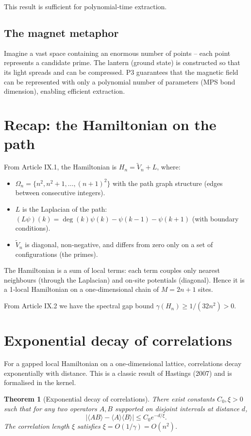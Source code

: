 \documentclass[11pt,a4paper]{article}
\newtheorem{theorem}{Theorem}[section]
\begin{document}
This result is sufficient for polynomial‑time extraction.

\subsection{The magnet metaphor}

Imagine a vast space containing an enormous number of points – each point represents a candidate prime. The lantern (ground state) is constructed so that its light spreads and can be compressed. P3 guarantees that the magnetic field can be represented with only a polynomial number of parameters (MPS bond dimension), enabling efficient extraction.

\section{Recap: the Hamiltonian on the path}

From Article IX.1, the Hamiltonian is $H_n = \tilde{V}_n + L$, where:
\begin{itemize}
\item $\Omega_n = \{n^2, n^2+1, \dots, (n+1)^2\}$ with the path graph structure (edges between consecutive integers).
\item $L$ is the Laplacian of the path: $(L\psi)(k) = \deg(k)\psi(k) - \psi(k-1) - \psi(k+1)$ (with boundary conditions).
\item $\tilde{V}_n$ is diagonal, non‑negative, and differs from zero only on a set of configurations (the primes).
\end{itemize}
The Hamiltonian is a sum of local terms: each term couples only nearest neighbours (through the Laplacian) and on‑site potentials (diagonal). Hence it is a 1‑local Hamiltonian on a one‑dimensional chain of $M = 2n+1$ sites.

From Article IX.2 we have the spectral gap bound $\gamma(H_n) \ge 1/(32n^2) > 0$.

\section{Exponential decay of correlations}

For a gapped local Hamiltonian on a one‑dimensional lattice, correlations decay exponentially with distance. This is a classic result of Hastings (2007) and is formalised in the kernel.

\begin{theorem}[Exponential decay of correlations]\label{thm:exp}
There exist constants $C_0,\xi>0$ such that for any two operators $A,B$ supported on disjoint intervals at distance $d$,
\[
|\langle AB\rangle - \langle A\rangle\langle B\rangle| \le C_0 e^{-d/\xi}.
\]
The correlation length $\xi$ satisfies $\xi = O(1/\gamma) = O(n^2)$.
\end{theorem}
\end{document}
